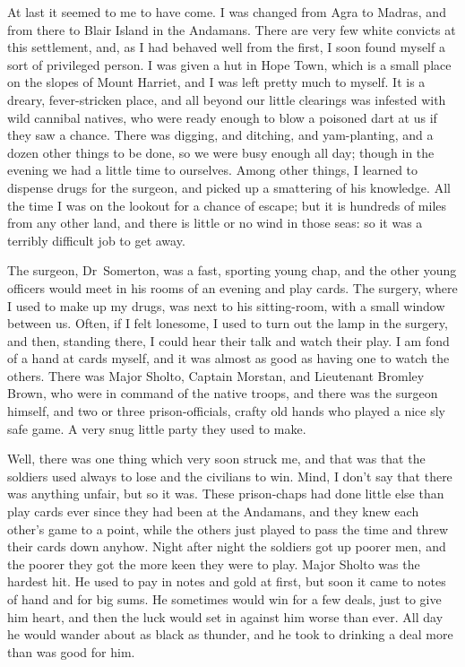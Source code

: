 At last it seemed to me to have come. I was changed from Agra to Madras, and from there to Blair Island in the Andamans. There are very few white convicts at this settlement, and, as I had behaved well from the first, I soon found myself a sort of privileged person. I was given a hut in Hope Town, which is a small place on the slopes of Mount Harriet, and I was left pretty much to myself. It is a dreary, fever-stricken place, and all beyond our little clearings was infested with wild cannibal natives, who were ready enough to blow a poisoned dart at us if they saw a chance. There was digging, and ditching, and yam-planting, and a dozen other things to be done, so we were busy enough all day; though in the evening we had a little time to ourselves. Among other things, I learned to dispense drugs for the surgeon, and picked up a smattering of his knowledge. All the time I was on the lookout for a chance of escape; but it is hundreds of miles from any other land, and there is little or no wind in those seas: so it was a terribly difficult job to get away.

The surgeon, Dr~Somerton, was a fast, sporting young chap, and the other young officers would meet in his rooms of an evening and play cards. The surgery, where I used to make up my drugs, was next to his sitting-room, with a small window between us. Often, if I felt lonesome, I used to turn out the lamp in the surgery, and then, standing there, I could hear their talk and watch their play. I am fond of a hand at cards myself, and it was almost as good as having one to watch the others. There was Major Sholto, Captain Morstan, and Lieutenant Bromley Brown, who were in command of the native troops, and there was the surgeon himself, and two or three prison-officials, crafty old hands who played a nice sly safe game. A very snug little party they used to make.

Well, there was one thing which very soon struck me, and that was that the soldiers used always to lose and the civilians to win. Mind, I don't say that there was anything unfair, but so it was. These prison-chaps had done little else than play cards ever since they had been at the Andamans, and they knew each other's game to a point, while the others just played to pass the time and threw their cards down anyhow. Night after night the soldiers got up poorer men, and the poorer they got the more keen they were to play. Major Sholto was the hardest hit. He used to pay in notes and gold at first, but soon it came to notes of hand and for big sums. He sometimes would win for a few deals, just to give him heart, and then the luck would set in against him worse than ever. All day he would wander about as black as thunder, and he took to drinking a deal more than was good for him.

